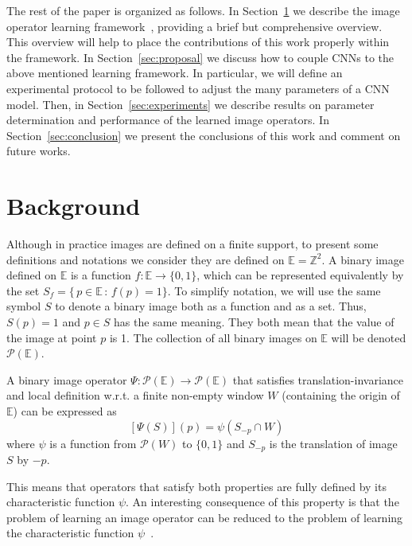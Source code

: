 \documentclass[conference]{IEEEtran}
\begin{document}
The rest of the paper is organized as follows. In
Section~\ref{sec:background} we describe the image operator learning
framework~\cite{2016:tutorialSIB}, providing a brief but comprehensive
overview. This overview will help to place the contributions of
this work properly within the framework. In Section~\ref{sec:proposal}
we discuss how to couple CNNs to the above mentioned learning
framework. In particular, we will define an experimental protocol to
be followed to adjust the many parameters of a CNN model. Then, in
Section~\ref{sec:experiments} we describe results on parameter
determination and performance of the learned image operators. In
Section~\ref{sec:conclusion} we present the conclusions of this work
and comment on future works.


\section{Background}
\label{sec:background}

Although in practice images are defined on a finite support, to
present some definitions and notations we consider they are defined on
$\mathbb{E}=\mathbb{Z}^2$. A binary image defined on $\mathbb{E}$ is a
function $f: \mathbb{E} \to \{0,1\}$, which can be represented
equivalently by the set $S_f = \{\, p \in\mathbb{E} \,:\, f(p) = 1
\}$. To simplify
notation, we will use the same symbol $S$ to denote a binary image
both as a function and as a set. Thus, $S(p)=1$ and $p \in S$ has the
same meaning. They both mean that the value of the image at point $p$
is 1. The collection of all binary images on $\mathbb{E}$ will be
denoted $\mathcal{P}(\mathbb{E})$.

A binary image operator $\Psi: \mathcal{P}(\mathbb{E}) \to
\mathcal{P}(\mathbb{E})$ that satisfies translation-invariance and
local definition w.r.t. a finite non-empty window $W$ (containing the
origin of $\mathbb{E}$) can be expressed as
\begin{equation}
  \label{eq:local_definition}
  [\Psi(S)](p) = \psi(S_{-p}\cap W)
\end{equation}
where $\psi$ is a function from $\mathcal{P}(W)$ to $\{0,1\}$ and
$S_{-p}$ is the translation of image $S$ by $-p$.

This means that operators that satisfy both properties are fully
defined by its characteristic function $\psi$. An interesting
consequence of this property is that the problem of learning an image
operator can be reduced to the problem of learning the characteristic
function $\psi$~\cite{2016:tutorialSIB}.
\end{document}
